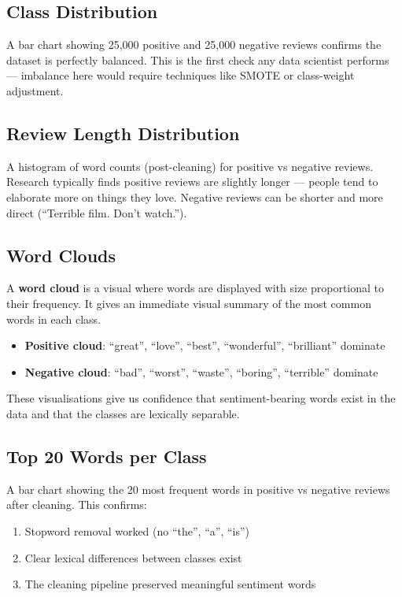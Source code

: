 \documentclass[12pt, a4paper]{article}
\begin{document}
\subsection{Class Distribution}

A bar chart showing 25{,}000 positive and 25{,}000 negative reviews confirms the dataset is perfectly balanced. This is the first check any data scientist performs — imbalance here would require techniques like SMOTE or class-weight adjustment.

\subsection{Review Length Distribution}

A histogram of word counts (post-cleaning) for positive vs negative reviews. Research typically finds positive reviews are slightly longer — people tend to elaborate more on things they love. Negative reviews can be shorter and more direct (``Terrible film. Don't watch.'').

\subsection{Word Clouds}

A \textbf{word cloud} is a visual where words are displayed with size proportional to their frequency. It gives an immediate visual summary of the most common words in each class.

\begin{itemize}
  \item \textcolor{positive}{\textbf{Positive cloud}}: ``great'', ``love'', ``best'', ``wonderful'', ``brilliant'' dominate
  \item \textcolor{negative}{\textbf{Negative cloud}}: ``bad'', ``worst'', ``waste'', ``boring'', ``terrible'' dominate
\end{itemize}

These visualisations give us confidence that sentiment-bearing words exist in the data and that the classes are lexically separable.

\subsection{Top 20 Words per Class}

A bar chart showing the 20 most frequent words in positive vs negative reviews after cleaning. This confirms:
\begin{enumerate}
  \item Stopword removal worked (no ``the'', ``a'', ``is'')
  \item Clear lexical differences between classes exist
  \item The cleaning pipeline preserved meaningful sentiment words
\end{enumerate}
\end{document}
